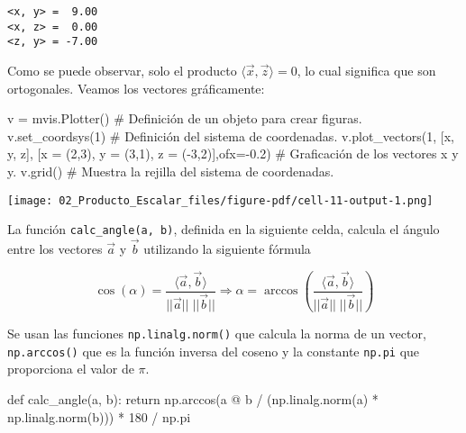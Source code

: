 \documentclass[
  letterpaper,
  DIV=11,
  numbers=noendperiod]{scrreprt}
\newenvironment{Shaded}{\begin{snugshade}}{\end{snugshade}}
\newcommand{\CommentTok}[1]{\textcolor[rgb]{0.37,0.37,0.37}{#1}}
\newcommand{\ControlFlowTok}[1]{\textcolor[rgb]{0.00,0.23,0.31}{#1}}
\newcommand{\DecValTok}[1]{\textcolor[rgb]{0.68,0.00,0.00}{#1}}
\newcommand{\FloatTok}[1]{\textcolor[rgb]{0.68,0.00,0.00}{#1}}
\newcommand{\KeywordTok}[1]{\textcolor[rgb]{0.00,0.23,0.31}{#1}}
\newcommand{\NormalTok}[1]{\textcolor[rgb]{0.00,0.23,0.31}{#1}}
\newcommand{\OperatorTok}[1]{\textcolor[rgb]{0.37,0.37,0.37}{#1}}
\newcommand{\StringTok}[1]{\textcolor[rgb]{0.13,0.47,0.30}{#1}}
\begin{document}
\begin{verbatim}
<x, y> =  9.00
<x, z> =  0.00
<z, y> = -7.00
\end{verbatim}

Como se puede observar, solo el producto
\(\langle \vec{x}, \vec{z} \rangle = 0\), lo cual significa que son
ortogonales. Veamos los vectores gráficamente:

\begin{Shaded}
\begin{Highlighting}[]
\NormalTok{v }\OperatorTok{=}\NormalTok{ mvis.Plotter()  }\CommentTok{\# Definición de un objeto para crear figuras.}
\NormalTok{v.set\_coordsys(}\DecValTok{1}\NormalTok{)   }\CommentTok{\# Definición del sistema de coordenadas.}
\NormalTok{v.plot\_vectors(}\DecValTok{1}\NormalTok{, [x, y, z], [}\StringTok{\textquotesingle{}x = (2,3)\textquotesingle{}}\NormalTok{, }\StringTok{\textquotesingle{}y = (3,1)\textquotesingle{}}\NormalTok{, }\StringTok{\textquotesingle{}z = ({-}3,2)\textquotesingle{}}\NormalTok{],ofx}\OperatorTok{={-}}\FloatTok{0.2}\NormalTok{) }\CommentTok{\# Graficación de los vectores \textquotesingle{}x\textquotesingle{} y \textquotesingle{}y\textquotesingle{}.}
\NormalTok{v.grid()  }\CommentTok{\# Muestra la rejilla del sistema de coordenadas.}
\end{Highlighting}
\end{Shaded}

\texttt{[image: 02\_Producto\_Escalar\_files/figure-pdf/cell-11-output-1.png]}

La función \texttt{calc\_angle(a,\ b)}, definida en la siguiente celda,
calcula el ángulo entre los vectores \(\vec{a}\) y \(\vec{b}\)
utilizando la siguiente fórmula

\[
\cos(\alpha)  = \dfrac{\langle \vec{a}, \vec{b} \rangle}{||\vec{a}|| \; || \vec{b}||}
\Longrightarrow \alpha = \arccos \left(\dfrac{\langle \vec{a}, \vec{b} \rangle}{||\vec{a}|| \; || \vec{b}||} \right)
\]

Se usan las funciones \texttt{np.linalg.norm()} que calcula la norma de
un vector, \texttt{np.arccos()} que es la función inversa del coseno y
la constante \texttt{np.pi} que proporciona el valor de \(\pi\).

\begin{Shaded}
\begin{Highlighting}[]
\KeywordTok{def}\NormalTok{ calc\_angle(a, b):}
    \ControlFlowTok{return}\NormalTok{ np.arccos(a }\OperatorTok{@}\NormalTok{ b }\OperatorTok{/}\NormalTok{ (np.linalg.norm(a) }\OperatorTok{*}\NormalTok{ np.linalg.norm(b))) }\OperatorTok{*} \DecValTok{180} \OperatorTok{/}\NormalTok{ np.pi}
\end{Highlighting}
\end{Shaded}
\end{document}
